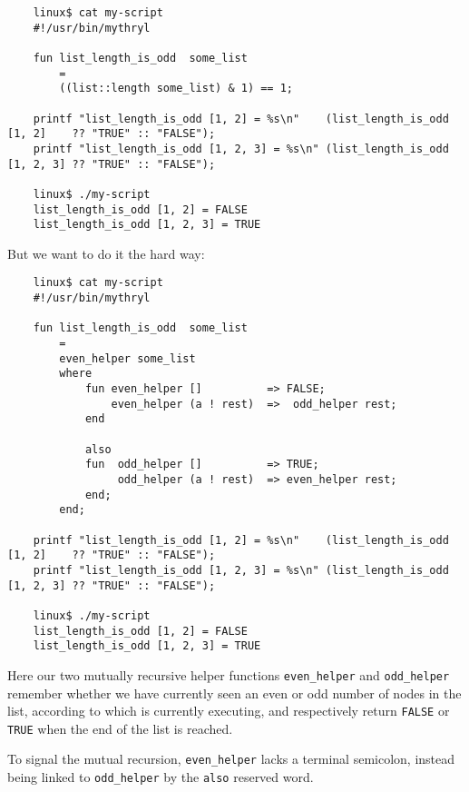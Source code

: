 \begin{verbatim}
    linux$ cat my-script
    #!/usr/bin/mythryl

    fun list_length_is_odd  some_list
        =
        ((list::length some_list) & 1) == 1;

    printf "list_length_is_odd [1, 2] = %s\n"    (list_length_is_odd [1, 2]    ?? "TRUE" :: "FALSE");
    printf "list_length_is_odd [1, 2, 3] = %s\n" (list_length_is_odd [1, 2, 3] ?? "TRUE" :: "FALSE");

    linux$ ./my-script
    list_length_is_odd [1, 2] = FALSE
    list_length_is_odd [1, 2, 3] = TRUE
\end{verbatim}

But we want to do it the hard way:

\begin{verbatim}
    linux$ cat my-script
    #!/usr/bin/mythryl

    fun list_length_is_odd  some_list
        =
        even_helper some_list
        where
            fun even_helper []          => FALSE;
                even_helper (a ! rest)  =>  odd_helper rest;
            end

            also
            fun  odd_helper []          => TRUE;
                 odd_helper (a ! rest)  => even_helper rest;
            end;
        end;

    printf "list_length_is_odd [1, 2] = %s\n"    (list_length_is_odd [1, 2]    ?? "TRUE" :: "FALSE");
    printf "list_length_is_odd [1, 2, 3] = %s\n" (list_length_is_odd [1, 2, 3] ?? "TRUE" :: "FALSE");

    linux$ ./my-script
    list_length_is_odd [1, 2] = FALSE
    list_length_is_odd [1, 2, 3] = TRUE
\end{verbatim}

Here our two mutually recursive helper functions {\tt even\_helper} and {\tt odd\_helper} 
remember whether we have currently seen an even or odd number of nodes in the list, 
according to which is currently executing, and respectively return {\tt FALSE} or {\tt TRUE} 
when the end of the list is reached.

To signal the mutual recursion, {\tt even\_helper} lacks a terminal semicolon, instead 
being linked to {\tt odd\_helper} by the {\tt also} reserved word.

\cutend*

